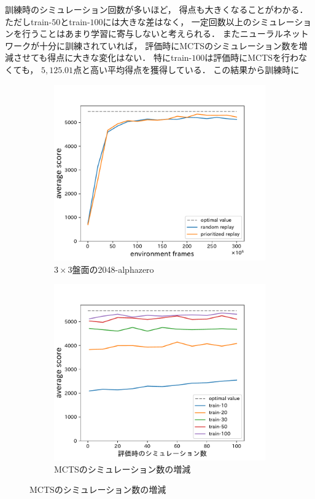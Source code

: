 訓練時のシミュレーション回数が多いほど， 得点も大きくなることがわかる．
ただしtrain-$50$とtrain-$100$には大きな差はなく， 一定回数以上のシミュレーションを行うことはあまり学習に寄与しないと考えられる．
またニューラルネットワークが十分に訓練されていれば， 評価時にMCTSのシミュレーション数を増減させても得点に大きな変化はない．
特にtrain-$100$は評価時にMCTSを行わなくても， $5,125.01$点と高い平均得点を獲得している．
この結果から訓練時に
\begin{figure}
    \begin{subfigure}[T]{0.5\columnwidth}
        \centering
        \includegraphics[width=\columnwidth]{figures/alphazero_3x3.pdf}
        \caption{$3\times3$盤面の2048-alphazero}
        \label{fig:mini2048_alphazero}
    \end{subfigure}
    \begin{subfigure}[T]{0.5\columnwidth}
        \centering
        \includegraphics[width=\columnwidth]{figures/3x3_2048_alphazero_simulations.pdf}
        \caption{MCTSのシミュレーション数の増減}
        \label{fig:mini2048_alphazero_simulations}
    \end{subfigure}
\end{figure}

